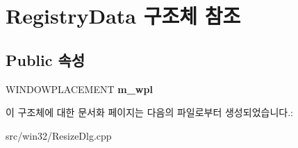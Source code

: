 \hypertarget{struct_registry_data}{}\section{Registry\+Data 구조체 참조}
\label{struct_registry_data}
\subsection*{Public 속성}
\begin{DoxyCompactItemize}
\item 
\mbox{\label{struct_registry_data_a8635a0973196376667281ae2ae52e6be}} 
W\+I\+N\+D\+O\+W\+P\+L\+A\+C\+E\+M\+E\+NT {\bfseries m\+\_\+wpl}
\end{DoxyCompactItemize}


이 구조체에 대한 문서화 페이지는 다음의 파일로부터 생성되었습니다.\+:\begin{DoxyCompactItemize}
\item 
src/win32/Resize\+Dlg.\+cpp\end{DoxyCompactItemize}
